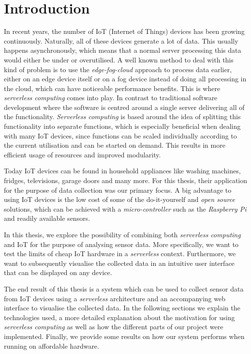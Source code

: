 \chapter{Introduction}
\label{sec:introduction}

In recent years, the number of IoT (Internet of Things) devices has been growing continuously.
Naturally, all of these devices generate a lot of data. This usually happens asynchronously, which
means that a normal server processing this data would either be under or overutilised. A well known
method to deal with this kind of problem is to use the \textit{edge-fog-cloud} approach to process
data earlier, either on an edge device itself or on a fog device instead of doing all processing in
the cloud, which can have noticeable performance benefits. This is where \textit{serverless
computing} comes into play. In contrast to traditional software development where the software is
centred around a single server delivering all of the functionality. \textit{Serverless computing} is
based around the idea of splitting this functionality into separate functions, which is especially
beneficial when dealing with many IoT devices, since functions can be scaled individually according
to the current utilisation and can be started on demand. This results in more efficient usage of
resources and improved modularity.

Today IoT devices can be found in household appliances like washing machines, fridges, televisions,
garage doors and many more. For this thesis, their application for the purpose of data collection
was our primary focus. A big advantage to using IoT devices is the low cost of some of the
do-it-yourself and \textit{open source} solutions, which can be achieved with a
\textit{micro-controller} such as the \textit{Raspberry Pi} and readily available
 sensors.

In this thesis, we explore the possibility of combining both \textit{serverless computing} and IoT
for the purpose of analysing sensor data. More specifically, we want to test the limits of cheap IoT
hardware in a \textit{serverless} context. Furthermore, we want to subsequently visualise the
collected data in an intuitive user interface that can be displayed on any device.

The end result of this thesis is a system which can be used to collect sensor data from IoT devices
using a \textit{serverless} architecture and an accompanying web interface to visualise the
collected data. In the following sections we explain the technologies used, a more detailed
explanation about the motivation for using \textit{serverless computing} as well as how the
different parts of our project were implemented. Finally, we provide some results on how our system
performs when running on affordable hardware.
